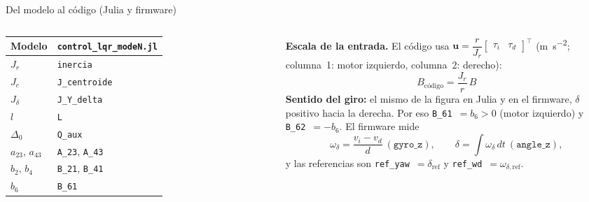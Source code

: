 \documentclass[10pt,aspectratio=169]{beamer}
\newcommand{\vu}{\mathbf{u}}
\newcommand{\rf}{\text{ref}}
\begin{document}
\begin{frame}{Del modelo al código (Julia y firmware)}
\begin{columns}[t]
\small
\begin{tabular}[t]{@{}ll@{}}
\toprule
Modelo & \texttt{control\_lqr\_modeN.jl}\\
\midrule
$J_r$ & \texttt{inercia}\\
$J_c$ & \texttt{J\_centroide}\\
$J_\delta$ & \texttt{J\_Y\_delta}\\
$l$ & \texttt{L}\\
$\Delta_0$ & \texttt{Q\_aux}\\
$a_{23},\,a_{43}$ & \texttt{A\_23}, \texttt{A\_43}\\
$b_2,\,b_4$ & \texttt{B\_21}, \texttt{B\_41}\\
$b_6$ & \texttt{B\_61}\\
\bottomrule
\end{tabular}

\small
\textbf{Escala de la entrada.} El código usa
$\vu=\dfrac{r}{J_r}\begin{bmatrix}\tau_i&\tau_d\end{bmatrix}^{\!\top}$
(\si{\meter\per\second\squared}; columna~1: motor izquierdo, columna~2: derecho):
\[
  B_{\text{código}}=\frac{J_r}{r}\,B
\]
\textbf{Sentido del giro:} el mismo de la figura en Julia y en el firmware,
$\delta$ positivo hacia la \alert{derecha}. Por eso \texttt{B\_61}~$=b_6>0$
(motor izquierdo) y \texttt{B\_62}~$=-b_6$. El firmware mide
\[
  \omega_\delta=\frac{v_i-v_d}{d}\ (\texttt{gyro\_z}),\qquad
  \delta=\int\omega_\delta\,dt\ (\texttt{angle\_z}),
\]
y las referencias son \texttt{ref\_yaw}~$=\delta_\rf$ y
\texttt{ref\_wd}~$=\omega_{\delta,\rf}$.
\end{columns}
\end{frame}
\end{document}
